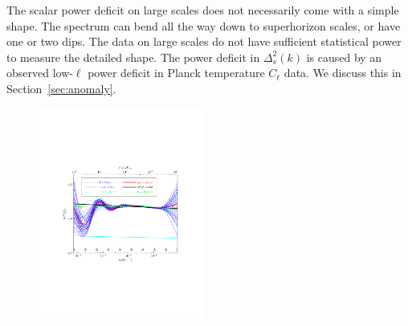 \documentclass[11pt]{article}
\def \halffigwidth{0.48\textwidth}
\begin{document}
The scalar power deficit on large scales does not necessarily come with a simple shape. The spectrum can bend all the way down to superhorizon scales, or have one or two dips. The data on large scales do not have sufficient statistical power to measure the detailed shape. The power deficit in $\Delta_s^2(k)$ is caused by an observed low-$\ell$ power deficit in Planck temperature $C_\ell$ data. We discuss this in Section~\ref{sec:anomaly}.

\begin{figure}
  \includegraphics[width=\halffigwidth,  trim = 1in 2.9in 1in 2.9in]{nobicep_spline0_p11_r0d02_power_traj.pdf}%

\end{figure}
\end{document}

